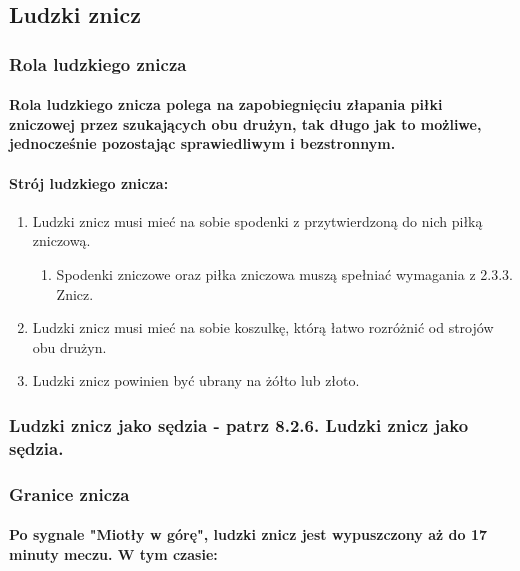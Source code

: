 \documentclass[12pt]{article}
\begin{document}
\subsection{Ludzki znicz}

\subsubsection{Rola ludzkiego znicza}

\paragraph{Rola ludzkiego znicza polega na zapobiegnięciu
	złapania piłki zniczowej przez szukających obu drużyn, tak długo jak to
	możliwe, jednocześnie pozostając sprawiedliwym i bezstronnym.}

\paragraph{Strój ludzkiego znicza:}

\begin{enumerate}
	\item
	      Ludzki znicz musi mieć na sobie spodenki z przytwierdzoną do nich
	      piłką zniczową.

	      \begin{enumerate}
		      \item
		            Spodenki zniczowe oraz piłka zniczowa muszą spełniać wymagania z
		            2.3.3. Znicz.
	      \end{enumerate}
	\item
	      Ludzki znicz musi mieć na sobie koszulkę, którą łatwo rozróżnić od
	      strojów obu drużyn.
	\item
	      Ludzki znicz powinien być ubrany na żółto lub złoto.
\end{enumerate}

\subsubsection{Ludzki znicz jako sędzia - patrz 8.2.6. Ludzki znicz jako sędzia.}

\subsubsection{Granice znicza}

\paragraph{Po sygnale "Miotły w górę", ludzki znicz jest
	wypuszczony aż do 17 minuty meczu. W tym czasie:}
\end{document}
